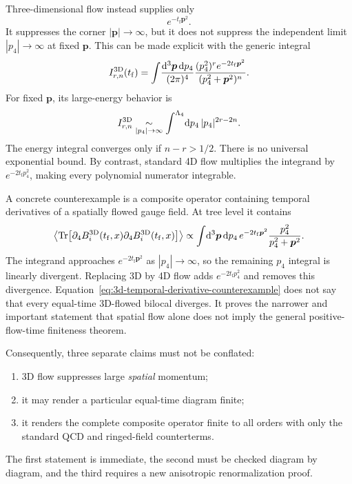\documentclass[11pt]{article}
\numberwithin{equation}{section}
\newcommand{\dd}{\mathrm{d}}
\newcommand{\tf}{t_{\mathrm f}}
\DeclareMathOperator{\Tr}{Tr}
\begin{document}
Three-dimensional flow instead supplies only
\begin{equation}
  e^{-\tf\bm p^2}.
\end{equation}
It suppresses the corner \(|\bm p|\to\infty\), but it does not suppress the
independent limit \(|p_4|\to\infty\) at fixed \(\bm p\).  This can be made
explicit with the generic integral
\begin{equation}
  I_{r,n}^{\rm 3D}(\tf)
  =
  \int\!\frac{\dd^3\bm p\,\dd p_4}{(2\pi)^4}
  \frac{(p_4^2)^r e^{-2\tf\bm p^2}}
       {(p_4^2+\bm p^2)^n}.
  \label{eq:3d-generic-uv-integral}
\end{equation}
For fixed \(\bm p\), its large-energy behavior is
\begin{equation}
  I_{r,n}^{\rm 3D}
  \underset{|p_4|\to\infty}{\sim}
  \int^{\Lambda_4}\!\dd p_4\,
  |p_4|^{2r-2n}.
  \label{eq:3d-energy-power-counting}
\end{equation}
The energy integral converges only if \(n-r>1/2\).  There is no universal
exponential bound.  By contrast, standard 4D flow multiplies the integrand by
\(e^{-2\tf p_4^2}\), making every polynomial numerator integrable.

A concrete counterexample is a composite operator containing temporal
derivatives of a spatially flowed gauge field.  At tree level it contains
\begin{equation}
  \left\langle
    \Tr\bigl[\partial_4B_i^{\rm 3D}(\tf,x)
             \partial_4B_i^{\rm 3D}(\tf,x)\bigr]
  \right\rangle
  \propto
  \int\!\dd^3\bm p\,\dd p_4\,
  e^{-2\tf\bm p^2}
  \frac{p_4^2}{p_4^2+\bm p^2}.
  \label{eq:3d-temporal-derivative-counterexample}
\end{equation}
The integrand approaches \(e^{-2\tf\bm p^2}\) as
\(|p_4|\to\infty\), so the remaining \(p_4\) integral is linearly divergent.
Replacing 3D by 4D flow adds \(e^{-2\tf p_4^2}\) and removes this divergence.
Equation~\eqref{eq:3d-temporal-derivative-counterexample} does not say that
every equal-time 3D-flowed bilocal diverges.  It proves the narrower and
important statement that spatial flow alone does not imply the general
positive-flow-time finiteness theorem.

Consequently, three separate claims must not be conflated:
\begin{enumerate}
  \item 3D flow suppresses large \emph{spatial} momentum;
  \item it may render a particular equal-time diagram finite;
  \item it renders the complete composite operator finite to all orders with
        only the standard QCD and ringed-field counterterms.
\end{enumerate}
The first statement is immediate, the second must be checked diagram by
diagram, and the third requires a new anisotropic renormalization proof.
\end{document}
